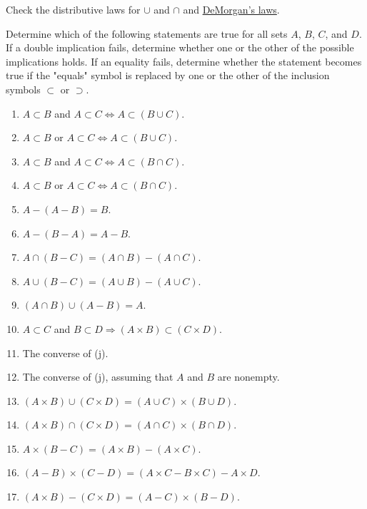  \begin{exercise}[Munkres 1.1]
    Check the distributive laws for $\cup$ and $\cap$ and \hyperref[thm:demorgan]{DeMorgan's laws}.
  \end{exercise}
  \begin{solution}
    
  \end{solution}

  \begin{exercise}[Munkres 1.2]
    Determine which of the following statements are true for all sets $A$, $B$, $C$, and $D$. If a double implication fails, determine whether one or the other of the possible implications holds. If an equality fails, determine whether the statement becomes true if the "equals" symbol is replaced by one or the other of the inclusion symbols $\subset$ or $\supset$.
    \begin{enumerate}
      \item $A \subset B$ and $A \subset C \iff A \subset (B \cup C)$.
      \item $A \subset B$ or $A \subset C \iff A \subset (B \cup C)$.
      \item $A \subset B$ and $A \subset C \iff A \subset (B \cap C)$.
      \item $A \subset B$ or $A \subset C \iff A \subset (B \cap C)$.
      \item $A - (A - B) = B$.
      \item $A - (B - A) = A - B$.
      \item $A \cap (B - C) = (A \cap B) - (A \cap C)$.
      \item $A \cup (B - C) = (A \cup B) - (A \cup C)$.
      \item $(A \cap B) \cup (A - B) = A$.
      \item $A \subset C$ and $B \subset D \Rightarrow (A \times B) \subset (C \times D)$.
      \item The converse of (j).
      \item The converse of (j), assuming that $A$ and $B$ are nonempty.
      \item $(A \times B) \cup (C \times D) = (A \cup C) \times (B \cup D)$.
      \item $(A \times B) \cap (C \times D) = (A \cap C) \times (B \cap D)$.
      \item $A \times (B - C) = (A \times B) - (A \times C)$.
      \item $(A - B) \times (C - D) = (A \times C - B \times C) - A \times D$.
      \item $(A \times B) - (C \times D) = (A - C) \times (B - D)$.
    \end{enumerate}
  \end{exercise}
  \begin{solution}
    
  \end{solution}

